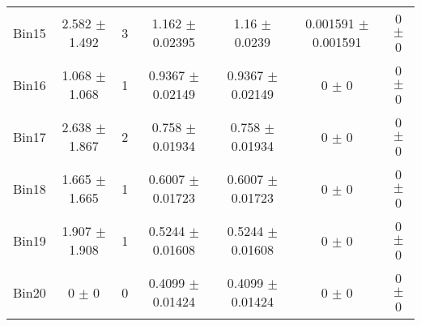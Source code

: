\begin{tabular}{@{\extracolsep{4pt}}lcccccc@{}}
     Bin15 & 2.582 $\pm$ 1.492 & 3 & 1.162 $\pm$ 0.02395 & 1.16 $\pm$ 0.0239 & 0.001591 $\pm$ 0.001591 & 0 $\pm$ 0 \\ 
     Bin16 & 1.068 $\pm$ 1.068 & 1 & 0.9367 $\pm$ 0.02149 & 0.9367 $\pm$ 0.02149 & 0 $\pm$ 0 & 0 $\pm$ 0 \\ 
     Bin17 & 2.638 $\pm$ 1.867 & 2 & 0.758 $\pm$ 0.01934 & 0.758 $\pm$ 0.01934 & 0 $\pm$ 0 & 0 $\pm$ 0 \\ 
     Bin18 & 1.665 $\pm$ 1.665 & 1 & 0.6007 $\pm$ 0.01723 & 0.6007 $\pm$ 0.01723 & 0 $\pm$ 0 & 0 $\pm$ 0 \\ 
     Bin19 & 1.907 $\pm$ 1.908 & 1 & 0.5244 $\pm$ 0.01608 & 0.5244 $\pm$ 0.01608 & 0 $\pm$ 0 & 0 $\pm$ 0 \\ 
     Bin20 & 0 $\pm$ 0 & 0 & 0.4099 $\pm$ 0.01424 & 0.4099 $\pm$ 0.01424 & 0 $\pm$ 0 & 0 $\pm$ 0 \\ 
\hline\hline
  \end{tabular}
